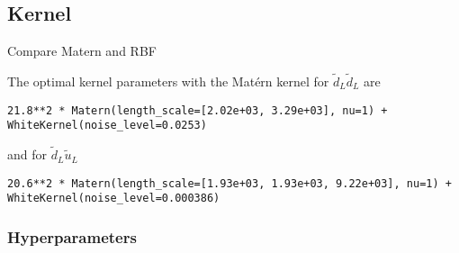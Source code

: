 \documentclass[twoside,english]{uiofysmaster}
\begin{document}


\subsection{Kernel}

Compare Matern and RBF


The optimal kernel parameters with the Mat\'{e}rn kernel for $\tilde{d}_L \tilde{d}_L$ are 
\begin{lstlisting}
21.8**2 * Matern(length_scale=[2.02e+03, 3.29e+03], nu=1) + WhiteKernel(noise_level=0.0253)
\end{lstlisting}
and for $\tilde{d}_L \tilde{u}_L$
\begin{lstlisting}
20.6**2 * Matern(length_scale=[1.93e+03, 1.93e+03, 9.22e+03], nu=1) + WhiteKernel(noise_level=0.000386)
\end{lstlisting}

\subsubsection{Hyperparameters}
\end{document}
